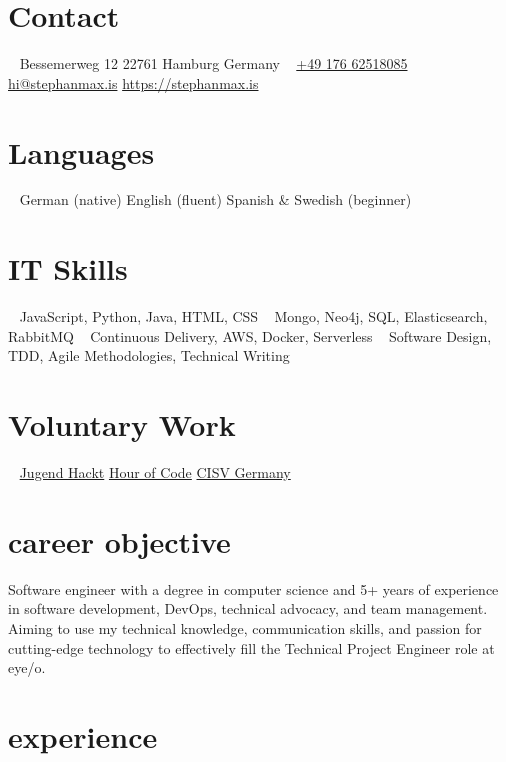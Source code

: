 \documentclass[a4paper]{cv}
\begin{document}

  \begin{aside}
    \section{Contact}
      ~
      Bessemerweg 12
      22761 Hamburg
      Germany
      ~
      \href{tel:+4917662518085}{+49 176 62518085}
      \href{mailto:hi@stephanmax.is}{hi@stephanmax.is}
      \href{https://stephanmax.is}{https://stephanmax.is}
    \section{Languages}
      ~
      German (native)
      English (fluent)
      Spanish \& Swedish (beginner)
    \section{IT Skills}
      ~
      JavaScript, Python, Java, HTML, CSS
      ~
      Mongo, Neo4j, SQL, Elasticsearch, RabbitMQ
      ~
      Continuous Delivery, AWS, Docker, Serverless
      ~
      Software Design, TDD, Agile Methodologies, Technical Writing
    \section{Voluntary Work}
      ~
      \href{https://jugendhackt.org/}{Jugend Hackt}
      \href{https://hourofcode.com/de}{Hour of Code}
      \href{http://de.cisv.org/}{CISV Germany}
  \end{aside}

  \section{career objective}

  Software engineer with a degree in computer science and 5+ years of experience in software development, DevOps, technical advocacy, and team management. Aiming to use my technical knowledge, communication skills, and passion for cutting-edge technology to effectively fill the Technical Project Engineer role at eye/o.

  \section{experience}
\end{document}

